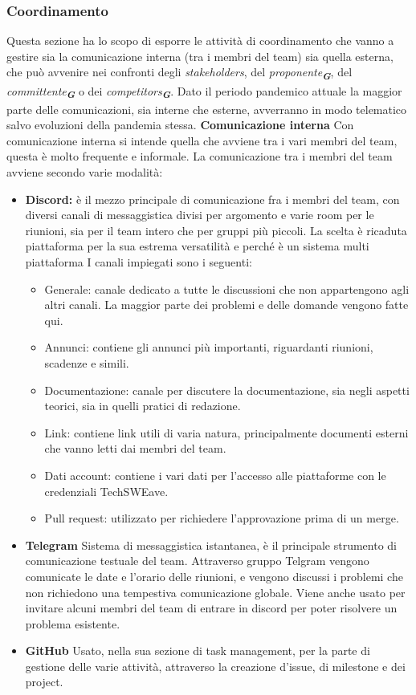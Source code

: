 \subsubsection{Coordinamento}
Questa sezione ha lo scopo di esporre le attività di coordinamento che vanno a gestire sia la comunicazione interna (tra i membri del team) sia quella esterna, che può avvenire nei confronti degli \textit{stakeholders}, del \textit{proponente\textsubscript{\textbf{G}}}, del \textit{committente\textsubscript{\textbf{G}}} o dei \textit{competitors\textsubscript{\textbf{G}}}. Dato il periodo pandemico attuale la maggior parte delle comunicazioni, sia interne che esterne, avverranno in modo telematico salvo evoluzioni della pandemia stessa.
\textbf{Comunicazione interna}
Con comunicazione interna si intende quella che avviene tra i vari membri del team, questa è molto frequente e informale. La comunicazione tra i membri del team avviene secondo varie modalità:
\begin{itemize}
    \item \textbf{Discord:}
          è il mezzo principale di comunicazione fra i membri del team, con diversi canali di messaggistica divisi per argomento e varie room per le riunioni, sia per il team intero che per gruppi più piccoli. La scelta è ricaduta piattaforma per la sua estrema versatilità e perché è un sistema multi piattaforma
          I canali impiegati sono i seguenti:
          \begin{itemize}
              \item Generale: canale dedicato a tutte le discussioni che non appartengono agli altri canali. La maggior parte dei problemi e delle domande vengono fatte qui.
              \item Annunci: contiene gli annunci più importanti, riguardanti riunioni, scadenze e simili.
              \item Documentazione: canale per discutere la documentazione, sia negli aspetti teorici, sia in quelli pratici di redazione.
              \item Link: contiene link utili di varia natura, principalmente documenti esterni che vanno letti dai membri del team.
              \item Dati account: contiene i vari dati per l'accesso alle piattaforme con le credenziali TechSWEave.
              \item Pull request: utilizzato per richiedere l'approvazione prima di un merge.
          \end{itemize}
    \item \textbf{Telegram}
          Sistema di messaggistica istantanea, è il principale strumento di comunicazione testuale del team. Attraverso gruppo Telgram vengono comunicate le date e l'orario delle riunioni, e vengono discussi i problemi che non richiedono una tempestiva comunicazione globale. Viene anche usato per invitare alcuni membri del team di entrare in discord per poter risolvere un problema esistente.
    \item \textbf{GitHub}
          Usato, nella sua sezione di task management, per la parte di gestione delle varie attività, attraverso la creazione d'issue, di milestone e dei project.
\end{itemize}
